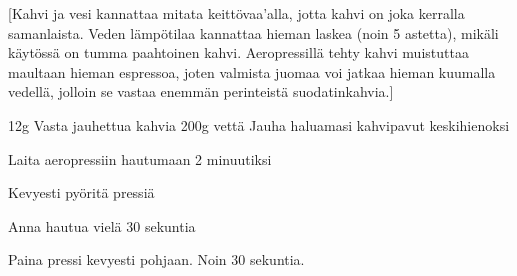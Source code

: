 [Kahvi ja vesi kannattaa mitata keittövaa'alla, jotta kahvi on joka kerralla samanlaista. Veden lämpötilaa kannattaa hieman laskea (noin 5 astetta), mikäli käytössä on tumma paahtoinen kahvi. Aeropressillä tehty kahvi muistuttaa maultaan hieman espressoa, joten valmista juomaa voi jatkaa hieman kuumalla vedellä, jolloin se vastaa enemmän perinteistä suodatinkahvia.]

\begin{step}
  12g Vasta jauhettua kahvia
  200g  vettä
  \method
  Jauha haluamasi kahvipavut keskihienoksi

  Laita aeropressiin hautumaan 2 minuutiksi

  Kevyesti pyöritä pressiä

  Anna hautua vielä 30 sekuntia

  Paina pressi kevyesti pohjaan. Noin 30 sekuntia.
\end{step}
